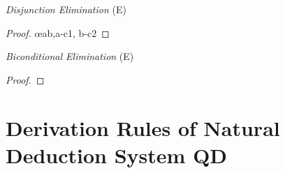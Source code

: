 \begin{multicols}{2}
\vspace{1em}

\textit{Disjunction Elimination} (\eor E)  \vspace{-1em}

\begin{proof}
	\open
		 
	\close
\breakline
	\open
		 
	\close
	 \oe{ab,a-c1, b-c2}
\end{proof}


\iffalse %
\begin{proof}
	\have[m]{ab}{\metaA{}\eor\metaB{}}
	\have[n]{nb}{\enot\metaB{}}
	\have[\ ]{a}{\metaA{}} \oe{ab,nb}
\end{proof}

\begin{proof}
	\have[m]{ab}{\metaA{}\eor\metaB{}}
	\have[n]{na}{\enot\metaA{}}
	\have[\ ]{b}{\metaB{}} \oe{ab,nb}
\end{proof}

\fi 





\textit{Biconditional Elimination} (\eiff E) \vspace{-1em}

\begin{proof}
	 
\end{proof}

\iffalse
\begin{proof}
	\have[m]{ab}{\metaA{}\eiff\metaB{}}
	\have[n]{a}{\metaA{}}
	\have[\ ]{b}{\metaB{}} \be{ab,a}
\end{proof}
\fi 



\end{multicols} %


\section*{\hfill \normalsize \bf Derivation Rules of Natural Deduction System QD \hfill} 
\label{nd-proofrules}
				
				\vspace{-1em}
				
